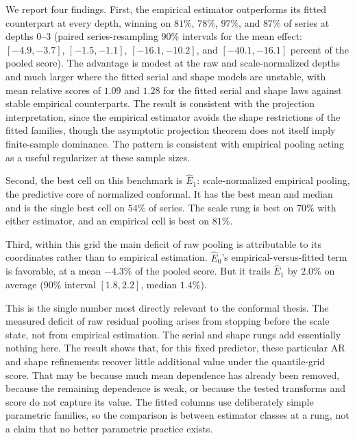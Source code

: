 \documentclass[11pt]{article}
\theoremstyle{remark}
\begin{document}
We report four findings. First, the empirical estimator outperforms its fitted counterpart
at every depth, winning on $81\%$, $78\%$, $97\%$, and $87\%$ of series at depths $0$--$3$
(paired series-resampling $90\%$ intervals for the mean effect: $[-4.9,-3.7]$,
$[-1.5,-1.1]$, $[-16.1,-10.2]$, and $[-40.1,-16.1]$ percent of the pooled score). The
advantage is modest at the raw and scale-normalized depths and much larger where the fitted
serial and shape models are unstable, with mean relative scores of $1.09$ and $1.28$ for the
fitted serial and shape laws against stable empirical counterparts. The result is consistent
with the projection interpretation, since the empirical estimator avoids the shape
restrictions of the fitted families, though the asymptotic projection theorem does not itself
imply finite-sample dominance. The pattern is consistent with empirical pooling acting as a
useful regularizer at these sample sizes.

Second, the best cell on this benchmark is $\widehat E_1$: scale-normalized empirical
pooling, the predictive core of normalized conformal. It has the best mean and median and is
the single best cell on $54\%$ of series. The scale rung is best on $70\%$ with either
estimator, and an empirical cell is best on $81\%$.

Third, within this grid the main deficit of raw pooling is attributable to its coordinates
rather than to empirical estimation. $\widehat E_0$'s
empirical-versus-fitted term is favorable, at a mean $-4.3\%$ of the pooled score. But it trails $\widehat E_1$ by $2.0\%$ on average ($90\%$ interval $[1.8,2.2]$, median
$1.4\%$).

\begin{center}
\end{center}

This is the single number most directly relevant to the conformal thesis. The measured
deficit of raw residual pooling arises from stopping before the scale state, not from
empirical estimation. The serial and shape rungs add essentially nothing here. The result shows that, for this fixed predictor, these particular AR and shape refinements
recover little additional value under the quantile-grid score. That may be because much mean
dependence has already been removed, because the remaining dependence is weak, or because the
tested transforms and score do not capture its value. The fitted columns use
deliberately simple parametric families, so the comparison is between estimator classes at a
rung, not a claim that no better parametric practice exists.
\end{document}
